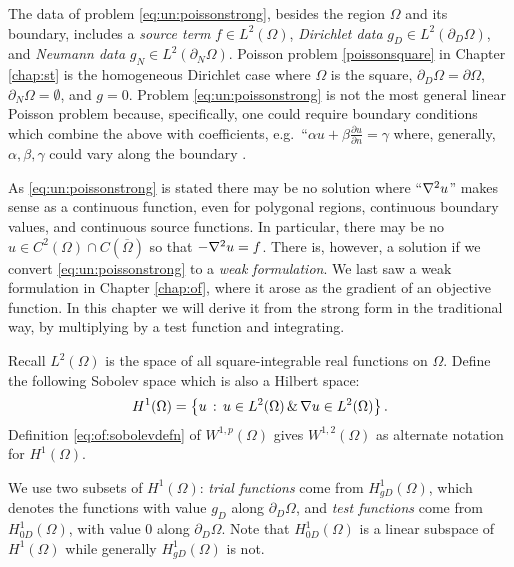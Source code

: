The data of problem \eqref{eq:un:poissonstrong}, besides the region $\Omega$ and its boundary, includes a \emph{source term} $f\in L^2(\Omega)$, \emph{Dirichlet data} $g_D\in L^2(\partial_D \Omega)$, and \emph{Neumann data} $g_N \in L^2(\partial_N \Omega)$.  Poisson problem \eqref{poissonsquare} in Chapter \ref{chap:st} is the homogeneous Dirichlet case where $\Omega$ is the square, $\partial_D \Omega = \partial \Omega$, $\partial_N \Omega = \emptyset$, and $g=0$.  Problem \eqref{eq:un:poissonstrong} is not the most general linear Poisson problem because, specifically, one could require boundary conditions which combine the above with coefficients, e.g.~``$\alpha u + \beta \frac{\partial u}{\partial n} = \gamma$ where, generally, $\alpha,\beta,\gamma$ could vary along the boundary \citep{Elmanetal2005}.

As \eqref{eq:un:poissonstrong} is stated there may be no solution where ``$\nabla^2 u$'' makes sense as a continuous function, even for polygonal regions, continuous boundary values, and continuous source functions.  In particular, there may be no $u\in C^2(\Omega) \cap C(\overline \Omega)$ so that $-\nabla^2 u = f$.  There is, however, a solution if we convert \eqref{eq:un:poissonstrong} to a \emph{weak formulation}.  We last saw a weak formulation in Chapter \ref{chap:of}, where it arose as the gradient of an objective function.  In this chapter we will derive it from the strong form in the traditional way, by multiplying by a test function and integrating.

Recall $L^2(\Omega)$ is the space of all square-integrable real functions on $\Omega$.  Define the following Sobolev space \citep{Evans2010} which is also a Hilbert space:
    $$H^1(\Omega) = \left\{u \,:\, u \in L^2(\Omega) \,\&\, \nabla u \in L^2(\Omega)\right\}.$$
Definition \eqref{eq:of:sobolevdefn} of $W^{1,p}(\Omega)$ gives $W^{1,2}(\Omega)$ as alternate notation for $H^1(\Omega)$.

We use two subsets of $H^1(\Omega)$: \emph{trial functions} come from $H_{gD}^1(\Omega)$, which denotes the functions with value $g_D$ along $\partial_D \Omega$, and \emph{test functions} come from $H_{0D}^1(\Omega)$, with value $0$ along $\partial_D \Omega$.  Note that $H_{0D}^1(\Omega)$ is a linear subspace of $H^1(\Omega)$ while generally $H_{gD}^1(\Omega)$ is not.

